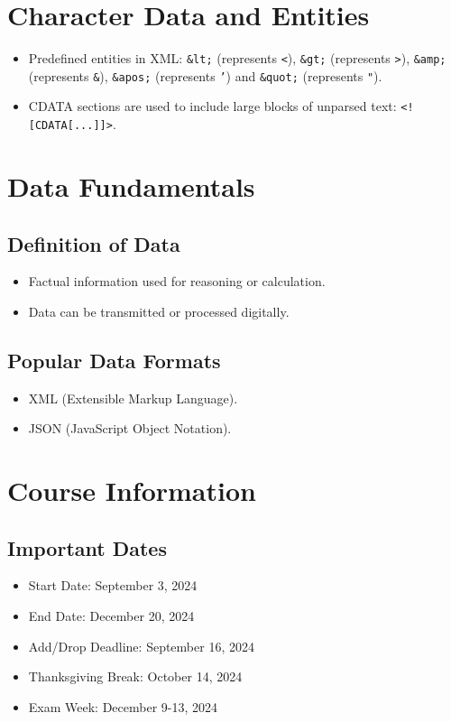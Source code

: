 \documentclass{article}
\begin{document}
\section{Character Data and Entities}
\begin{itemize}
    \item Predefined entities in XML: \texttt{\&lt;} (represents \texttt{<}), \texttt{\&gt;} (represents \texttt{>}), \texttt{\&amp;} (represents \texttt{\&}), \texttt{\&apos;} (represents \texttt{'}) and \texttt{\&quot;} (represents \texttt{"}).
    \item CDATA sections are used to include large blocks of unparsed text: \texttt{<![CDATA[...]]>}.
\end{itemize}

\section{Data Fundamentals}
\subsection{Definition of Data}
\begin{itemize}
    \item Factual information used for reasoning or calculation.
    \item Data can be transmitted or processed digitally.
\end{itemize}

\subsection{Popular Data Formats}
\begin{itemize}
    \item XML (Extensible Markup Language).
    \item JSON (JavaScript Object Notation).
\end{itemize}

\section{Course Information}
\subsection{Important Dates}
\begin{itemize}
    \item Start Date: September 3, 2024
    \item End Date: December 20, 2024
    \item Add/Drop Deadline: September 16, 2024
    \item Thanksgiving Break: October 14, 2024
    \item Exam Week: December 9-13, 2024
\end{itemize}
\end{document}
